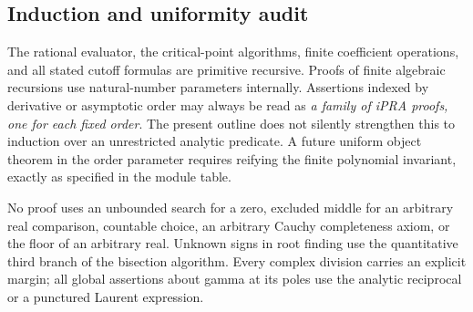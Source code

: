 \subsection{Induction and uniformity audit}

The rational evaluator, the critical-point algorithms, finite coefficient
operations, and all stated cutoff formulas are primitive recursive.
Proofs of finite algebraic recursions use natural-number parameters
internally. Assertions indexed by derivative or asymptotic order may
always be read as \emph{a family of iPRA proofs, one for each fixed
order}. The present outline does not silently strengthen this to
induction over an unrestricted analytic predicate. A future uniform
object theorem in the order parameter requires reifying the finite
polynomial invariant, exactly as specified in the module table.

No proof uses an unbounded search for a zero, excluded middle for an
arbitrary real comparison, countable choice, an arbitrary Cauchy
completeness axiom, or the floor of an arbitrary real. Unknown signs in
root finding use the quantitative third branch of the bisection
algorithm. Every complex division carries an explicit margin; all
global assertions about gamma at its poles use the analytic reciprocal
or a punctured Laurent expression.

